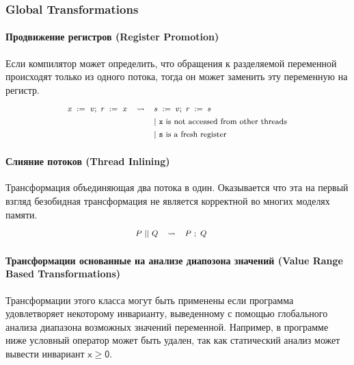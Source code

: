 \subsubsection{Global Transformations}

\paragraph{
Продвижение регистров
(Register Promotion)
}

Если компилятор может определить, что 
обращения к разделяемой переменной 
происходят только из одного потока,
тогда он может заменить эту переменную на регистр.
%
\[\def\arraystretch{1.4}\footnotesize
  \begin{array}{ccl} 

      \writeInst{}{x}{v} \seq \readInst{}{r}{x} 
    & \leadsto 
    & \assignInst{s}{v} \seq \assignInst{r}{s}
    \\ 
    
    & & |~ \text{\texttt{x} is not accessed from other threads} \\
    & & |~ \text{\texttt{s} is a fresh register} \\ 

  \end{array}
\]

\paragraph{Слияние потоков (Thread Inlining)}

Трансформация объединяющая два потока в один.
Оказывается что эта на первый взгляд безобидная
трансформация не является корректной во многих моделях памяти. 
%
\[\def\arraystretch{1.4}\footnotesize
  \begin{array}{cccl} 

      P \pll Q 
    & \leadsto 
    & P ~\seq Q
    & ~ \\ 
    
  \end{array}
\]


\paragraph{
Трансформации основанные на анализе диапозона значений
(Value Range Based Transformations)
}

Трансформации этого класса могут быть применены
если программа удовлетворяет некоторому инварианту,
выведенному с помощью глобального анализа 
диапазона возможных значений переменной.
Например, в программе ниже условный оператор
может быть удален, так как статический 
анализ может вывести инвариант 
$\mathsf{x} \geq \mathsf{0}$.

